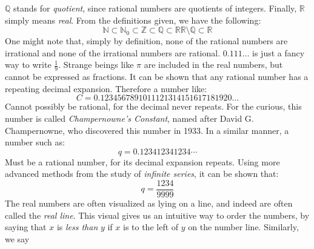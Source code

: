         $\mathbb{Q}$ stands for \textit{quotient}, since
        rational numbers are quotients of integers. Finally,
        $\mathbb{R}$ simply means \textit{real}.
        From the definitions given, we have the
        following:
        \begin{subequations}
            \begin{equation}
                \mathbb{N}
                \subset\mathbb{N}_{0}
                \subset\mathbb{Z}
                \subset\mathbb{Q}
                \subset\mathbb{R}
            \end{equation}
            \begin{equation}
                \mathbb{R}\setminus\mathbb{Q}
                \subset\mathbb{R}
            \end{equation}
        \end{subequations}
        One might note that, simply by definition, none of the
        rational numbers are irrational and none of the
        irrational numbers are rational.
        $0.111\hdots$ is just a fancy way to write $\frac{1}{9}$.
        Strange beings like $\pi$ are included in the real numbers,
        but cannot be expressed as fractions. It can be shown that
        any rational number has a repeating decimal expansion.
        Therefore a number like:
        \begin{equation}
            C=0.1234567891011121314151617181920\dots
        \end{equation}
        Cannot possibly be rational, for the decimal never repeats.
        For the curious, this number is called
        \textit{Champernowne's Constant}, named after David
        G. Champernowne, who discovered this number in 1933.
        In a similar manner, a number such as:
        \begin{equation}
            q=0.123412341234\cdots
        \end{equation}
        Must be a rational number, for its decimal expansion
        repeats. Using more advanced methods from the study
        of \textit{infinite series}, it can be shown that:
        \begin{equation}
            q=\frac{1234}{9999}
        \end{equation}
        The real numbers are often visualized as lying on a
        line, and indeed are often called the \textit{real line}.
        This visual gives us an intuitive way to order the numbers,
        by saying that $x$ is \textit{less than} $y$ if $x$ is
        to the left of $y$ on the number line. Similarly, we say
